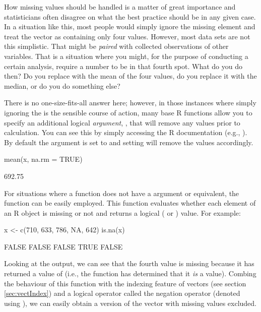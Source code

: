 How missing values should be handled is a matter of great importance and statisticians often disagree on what the best practice should be in any given case. In a situation like this, most people would simply ignore the missing element and treat the vector as containing only four values. However, most data sets are not this simplistic.  That  might be \textit{paired} with collected observations of other variables. That is a situation where you might, for the purpose of conducting a certain analysis, require a number to be in that fourth spot. What do you do then? Do you replace  with the mean of the four values, do you replace it with the median, or do you do something else?

There is no one-size-fits-all answer here; however, in those instances where simply ignoring the  is the sensible course of action, many base R functions allow you to specify an additional logical \textit{argument}, , that will remove any  values prior to calculation. You can see this by simply accessing the R documentation (e.g., ). By default the argument is set to  and setting  will remove the  values accordingly.

\begin{inR}
mean(x, na.rm = TRUE)
\end{inR}
\begin{outR}
[1] 692.75
\end{outR}

For situations where a function does not have a  argument or equivalent, the function  can be easily employed. This function evaluates whether each element of an R object is missing or not and returns a logical ( or ) value. For example:

\begin{inR}
x <- c(710, 633, 786, NA, 642)
is.na(x)
\end{inR}
\begin{outR}
[1] FALSE FALSE FALSE TRUE FALSE
\end{outR}

Looking at the output, we can see that the fourth value is missing because it has returned a value of  (i.e., the function has determined that it \textit{is} a  value).  Combing the behaviour of this function with the indexing feature of vectors (see section \ref{sec:vectIndex}) and a \gls{logical operator} called the \gls{negation operator} (denoted using \R{!}), we can easily obtain a version of the vector with missing values excluded.

